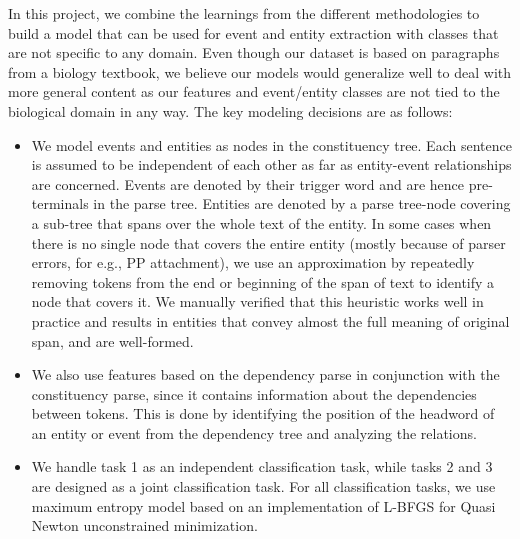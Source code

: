 In this project, we combine the learnings from the different methodologies to build a model that can be used for event and entity extraction with classes that are not specific to any domain. Even though our dataset is based on paragraphs from a biology textbook, we believe our models would generalize well to deal with more general content as our features and event/entity classes are not tied to the biological domain in any way. The key modeling decisions are as follows:

\begin{itemize}
\item We model events and entities as nodes in the constituency tree. Each sentence is assumed to be independent of each other as far as entity-event relationships are concerned. Events are denoted by their trigger word and are hence pre-terminals in the parse tree. Entities are denoted by a parse tree-node covering a sub-tree that spans over the whole text of the entity. In some cases when there is no single node that covers the entire entity (mostly because of parser errors, for e.g., PP attachment), we use an approximation by repeatedly removing tokens from the end or beginning of the span of text to identify a node that covers it. We manually verified that this heuristic works well in practice and results in entities that convey almost the full meaning of original span, and are well-formed.
\item We also use features based on the dependency parse in conjunction with the constituency parse, since it contains information about the dependencies between tokens. This is done by identifying the position of the headword of an entity or event from the dependency tree and analyzing the relations.
\item We handle task 1 as an independent classification task, while tasks 2 and 3 are designed as a joint classification task. For all classification tasks, we use maximum entropy model based on an implementation of L-BFGS for Quasi Newton unconstrained minimization.
\end{itemize}